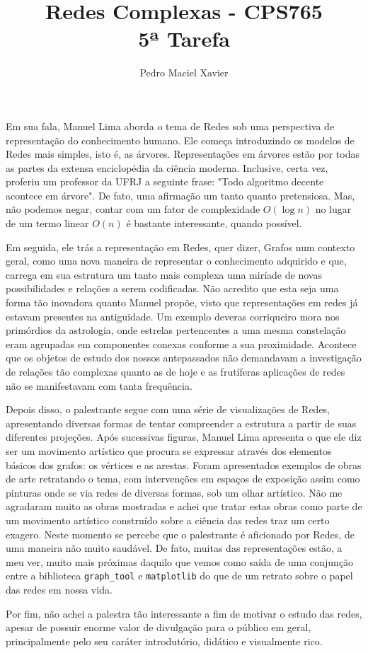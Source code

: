 \documentclass{homework}
\title{Redes Complexas - CPS765 \\[1ex]%
5ª Tarefa}
\author{Pedro Maciel Xavier}
\begin{document}
    \smaketitle %
    
    Em sua fala, Manuel Lima aborda o tema de Redes sob uma perspectiva de representação do conhecimento humano. Ele começa introduzindo os modelos de Redes mais simples, isto é, as árvores. Representações em árvores estão por todas as partes da extensa enciclopédia da ciência moderna. Inclusive, certa vez, proferiu um professor da UFRJ a seguinte frase: "Todo algoritmo decente acontece em árvore". De fato, uma afirmação um tanto quanto pretensiosa. Mas, não podemos negar, contar com um fator de complexidade $O(\log n)$ no lugar de um termo linear $O(n)$ é bastante interessante, quando possível.\par
    
    Em seguida, ele trás a representação em Redes, quer dizer, Grafos num contexto geral, como uma nova maneira de representar o conhecimento adquirido e que, carrega em sua estrutura um tanto mais complexa uma miríade de novas possibilidades e relações a serem codificadas. Não acredito que esta seja uma forma tão inovadora quanto Manuel propõe, visto que representações em redes já estavam presentes na antiguidade. Um exemplo deveras corriqueiro mora nos primórdios da astrologia, onde estrelas pertencentes a uma mesma constelação eram agrupadas em componentes conexas conforme a sua proximidade. Acontece que os objetos de estudo dos nossos antepassados não demandavam a investigação de relações tão complexas quanto as de hoje e as frutíferas aplicações de redes não se manifestavam com tanta frequência.\par
    
    Depois disso, o palestrante segue com uma série de visualizações de Redes, apresentando diversas formas de tentar compreender a estrutura a partir de suas diferentes projeções. Após sucessivas figuras, Manuel Lima apresenta o que ele diz ser um movimento artístico que procura se expressar através dos elementos básicos dos grafos: os vértices e as arestas. Foram apresentados exemplos de obras de arte retratando o tema, com intervenções em espaços de exposição assim como pinturas onde se via redes de diversas formas, sob um olhar artístico. Não me agradaram muito as obras mostradas e achei que tratar estas obras como parte de um movimento artístico construído sobre a ciência das redes traz um certo exagero. Neste momento se percebe que o palestrante é aficionado por Redes, de uma maneira não muito saudável. De fato, muitas das representações estão, a meu ver, muito mais próximas daquilo que vemos como saída de uma conjunção entre a biblioteca \texttt{graph\_tool} e \texttt{matplotlib} do que de um retrato sobre o papel das redes em nossa vida.\par
    
    Por fim, não achei a palestra tão interessante a fim de motivar o estudo das redes, apesar de possuir enorme valor de divulgação para o público em geral, principalmente pelo seu caráter introdutório, didático e visualmente rico.\par
    
    
\end{document}
